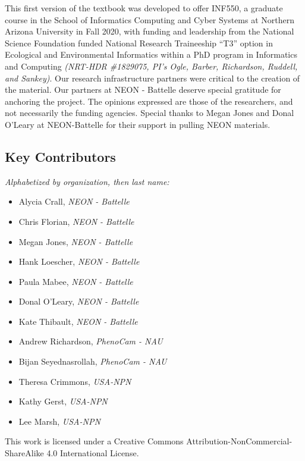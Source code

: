 \documentclass[
  letterpaper,
]{book}
\providecommand{\tightlist}{%
  \setlength{\itemsep}{0pt}\setlength{\parskip}{0pt}}
\begin{document}
This first version of the textbook was developed to offer INF550, a
graduate course in the School of Informatics Computing and Cyber Systems
at Northern Arizona University in Fall 2020, with funding and leadership
from the National Science Foundation funded National Research
Traineeship ``T3'' option in Ecological and Environmental Informatics
within a PhD program in Informatics and Computing \emph{(NRT-HDR
\#1829075, PI's Ogle, Barber, Richardson, Ruddell, and Sankey)}. Our
research infrastructure partners were critical to the creation of the
material. Our partners at NEON - Battelle deserve special gratitude for
anchoring the project. The opinions expressed are those of the
researchers, and not necessarily the funding agencies. Special thanks to
Megan Jones and Donal O'Leary at NEON-Battelle for their support in
pulling NEON materials.

\subsection*{Key Contributors}\label{key-contributors}

\emph{Alphabetized by organization, then last name:}

\begin{itemize}
\tightlist
\item
  Alycia Crall, \emph{NEON - Battelle}
\item
  Chris Florian, \emph{NEON - Battelle}
\item
  Megan Jones, \emph{NEON - Battelle}
\item
  Hank Loescher, \emph{NEON - Battelle}
\item
  Paula Mabee, \emph{NEON - Battelle}
\item
  Donal O'Leary, \emph{NEON - Battelle}
\item
  Kate Thibault, \emph{NEON - Battelle}
\item
  Andrew Richardson, \emph{PhenoCam - NAU}
\item
  Bijan Seyednasrollah, \emph{PhenoCam - NAU}
\item
  Theresa Crimmons, \emph{USA-NPN}
\item
  Kathy Gerst, \emph{USA-NPN}
\item
  Lee Marsh, \emph{USA-NPN}
\end{itemize}

This work is licensed under a Creative Commons
Attribution-NonCommercial-ShareAlike 4.0 International License.
\end{document}
